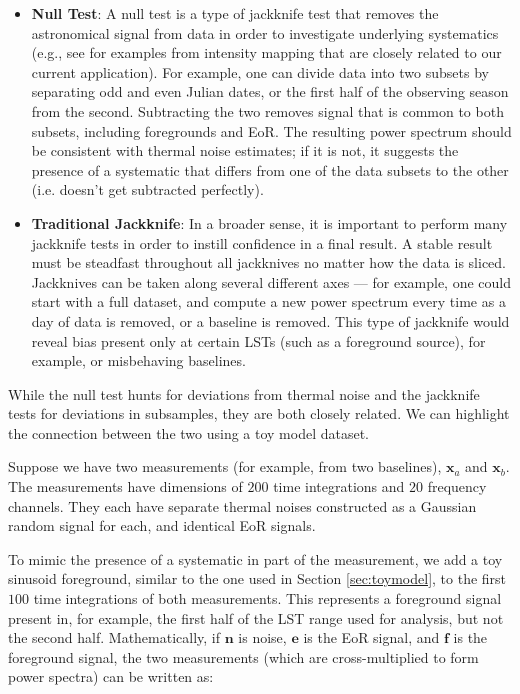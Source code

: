 \documentclass[preprint2,numberedappendix,tighten]{aastex6}  %
\begin{document}
\begin{itemize}
\item \textbf{Null Test}: A null test is a type of jackknife test that removes the astronomical signal from data in order to 
investigate underlying systematics (e.g., see \citet{keating_et_al2016} for examples from intensity mapping that are closely related to our current application). For example, one can 
divide data into two subsets by separating odd and even Julian dates, or the first half of the observing season from the second. 
Subtracting the two removes signal that is common to both subsets, including foregrounds and EoR. The resulting power 
spectrum should be consistent with thermal noise estimates; if it is not, it suggests the presence of a systematic that differs 
from one of the data subsets to the other (i.e. doesn't get subtracted perfectly). 
\item \textbf{Traditional Jackknife}: In a broader sense, it is important to perform many jackknife tests in order to instill 
confidence in a final result. A stable result must be steadfast throughout all jackknives no matter how the data is sliced. 
Jackknives can be taken along several different axes --- for example, one could start with a full dataset, and compute a new 
power spectrum every time as a day of data is removed, or a baseline is removed. This type of jackknife would reveal bias 
present only at certain LSTs (such as a foreground source), for example, or misbehaving baselines.
\end{itemize}

While the null test hunts for deviations from thermal noise and the jackknife tests for deviations in subsamples, they are both 
closely related. We can highlight the connection between the two using a toy model dataset.

Suppose we have two measurements (for example, from two baselines), $\textbf{x}_{a}$ and $\textbf{x}_{b}$. The 
measurements have dimensions of $200$ time integrations and $20$ frequency channels. They each have separate thermal 
noises constructed as a Gaussian random signal for each, and identical EoR signals. 

To mimic the presence of a systematic in part of the measurement, we add a toy sinusoid foreground, similar to the one used in 
Section \ref{sec:toymodel}, to the first $100$ time integrations of both measurements. This represents a foreground signal 
present in, for example, the first half of the LST range used for analysis, but not the second half. Mathematically, if  $\textbf{n}$ 
is noise, $\textbf{e}$ is the EoR signal, and $\textbf{f}$ is the foreground signal, the two measurements (which are cross-multiplied to form power spectra) can be written as:
\end{document}
